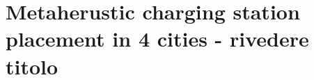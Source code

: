 
\chapter{Metaherustic charging station placement in 4 cities - rivedere titolo}
\label{chap:6_4cities}
	\graphicspath{{Chapter6/}}









%







